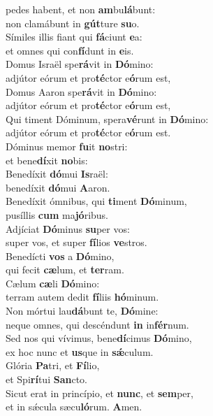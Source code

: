 {  \vin pedes habent, et non \textbf{am}bu\textbf{lá}bunt:~\*\\
  \vin non clamábunt in \textbf{gút}ture \textbf{su}o.\\
  Símiles illis fiant qui \textbf{fá}ciunt \textbf{e}a:~\*\\
  \vin et omnes qui con\textbf{fí}dunt in \textbf{e}is.\\
  Domus Israël spe\textbf{rá}vit in \textbf{Dó}mino:~\*\\
  \vin adjútor eórum et pro\textbf{té}ctor e\textbf{ó}rum est,\\
  Domus Aaron spe\textbf{rá}vit in \textbf{Dó}mino:~\*\\
  \vin adjútor eórum et pro\textbf{té}ctor e\textbf{ó}rum est,\\
  Qui timent Dóminum, spera\textbf{vé}runt in \textbf{Dó}mino:~\*\\
  \vin adjútor eórum et pro\textbf{té}ctor e\textbf{ó}rum est.\\
  Dóminus memor \textbf{fu}it \textbf{no}stri:~\*\\
  \vin et bene\textbf{dí}xit \textbf{no}bis:\\
  Benedíxit \textbf{dó}mui \textbf{Is}raël:~\*\\
  \vin benedíxit \textbf{dó}mui \textbf{A}aron.\\
  Benedíxit ómnibus, qui \textbf{ti}ment \textbf{Dó}minum,~\*\\
  \vin pusíllis \textbf{cum} ma\textbf{jó}ribus.\\
  Adjíciat \textbf{Dó}minus \textbf{su}per vos:~\*\\
  \vin super vos, et super \textbf{fí}lios \textbf{ve}stros.\\
  Benedícti \textbf{vos} a \textbf{Dó}mino,~\*\\
  \vin qui fecit \textbf{cæ}lum, et \textbf{ter}ram.\\
  Cælum \textbf{cæ}li \textbf{Dó}mino:~\*\\
  \vin terram autem dedit \textbf{fí}liis \textbf{hó}minum.\\
  Non mórtui lau\textbf{dá}bunt te, \textbf{Dó}mine:~\*\\
  \vin neque omnes, qui descéndunt \textbf{in} in\textbf{fér}num.\\
  Sed nos qui vívimus, bene\textbf{dí}cimus \textbf{Dó}mino,~\*\\
  \vin ex hoc nunc et \textbf{us}que in \textbf{sǽ}culum.\\
  Glória \textbf{Pa}tri, et \textbf{Fí}lio,~\*\\
  \vin et Spi\textbf{rí}tui \textbf{San}cto.\\
  Sicut erat in princípio, et \textbf{nunc}, et \textbf{sem}per,~\*\\
  \vin et in sǽcula sæcu\textbf{ló}rum. \textbf{A}men.\\
}



